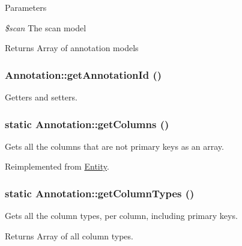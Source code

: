 \begin{DoxyParams}{Parameters}
\item[{\em \$scan}]The scan model \end{DoxyParams}
\begin{DoxyReturn}{Returns}
Array of annotation models 
\end{DoxyReturn}
\hypertarget{classAnnotation_adbcbb98bb486349e29dbf508e4c20b41}{
\subsubsection[{getAnnotationId}]{\setlength{\rightskip}{0pt plus 5cm}Annotation::getAnnotationId ()}}
\label{classAnnotation_adbcbb98bb486349e29dbf508e4c20b41}
Getters and setters. \hypertarget{classAnnotation_a9e9b41c456e409ae6223258c4ba1fb94}{
\subsubsection[{getColumns}]{\setlength{\rightskip}{0pt plus 5cm}static Annotation::getColumns ()}}
\label{classAnnotation_a9e9b41c456e409ae6223258c4ba1fb94}
Gets all the columns that are not primary keys as an array. 

Reimplemented from \hyperlink{classEntity_a394717a08ffd54ec9a14d06727c86719}{Entity}.

\hypertarget{classAnnotation_a0081ac8f6cf11cce9ca0e6e4ed5d9ffc}{
\subsubsection[{getColumnTypes}]{\setlength{\rightskip}{0pt plus 5cm}static Annotation::getColumnTypes ()}}
\label{classAnnotation_a0081ac8f6cf11cce9ca0e6e4ed5d9ffc}
Gets all the column types, per column, including primary keys.

\begin{DoxyReturn}{Returns}
Array of all column types. 
\end{DoxyReturn}


